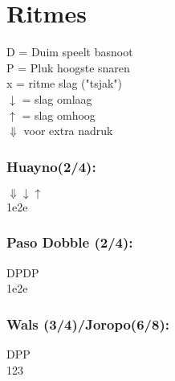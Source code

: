 \section{Ritmes}
	D = Duim speelt basnoot\\
	P = Pluk hoogste snaren\\
	x = ritme slag ("tsjak")\\
	$\downarrow$ = slag omlaag\\
	$\uparrow$ = slag omhoog\\	
	$\Downarrow$ voor extra nadruk\\
	
\subsubsection*{Huayno(2/4):}
$\Downarrow$\hspace{2em}\hphantom{a}\hspace{2em}$\downarrow$\hspace{2em}$\uparrow$\\
1\hspace{2em}e\hspace{2em}2\hspace{2em}e\\

\subsubsection*{Paso Dobble (2/4):}
D\hspace{1.8em}P\hspace{1.8em}D\hspace{1.9em}P\\
1\hspace{2em}e\hspace{2em}2\hspace{2em}e\\

\subsubsection*{Wals (3/4)/Joropo(6/8):}
D\hspace{1.8em}P\hspace{1.8em}P\\
1\hspace{2em}2\hspace{2em}3\\

